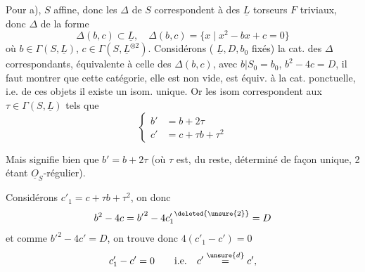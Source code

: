 
Pour a),  $S$ affine, donc les  $\Delta$  de $S$ correspondent à des $\underline L$ torseurs $F$ triviaux, donc $\Delta$  de la forme
\[\Delta(b,c)\subset\underline L,\quad\Delta(b,c)=\{x\mid x^2-bx+c=0\}\]
où $b\in\Gamma(S,\underline L)$, $c\in\Gamma(S,\underline L^{\otimes2})$. Considérons ( $\underline L,D,b_0$ fixés) la cat. des $\Delta$ correspondants,  équivalente à celle des $\Delta(b,c)$, avec $b|S_0=b_0$, $b^2-4c=D$, il faut montrer que cette catégorie,   elle est non vide, est équiv. à la cat. ponctuelle, i.e.   de ces objets il existe un isom. unique. Or les  isom  correspondent aux $\tau\in\Gamma(S,\underline L)$ tels que
\[\left\{\begin{aligned} b'&=b+2\tau\\ c'&=c+\tau b+\tau^2\end{aligned}\right.\]

Mais   signifie bien que $b'=b+2\tau$ (où $\tau$ est, du reste, déterminé de façon unique, 2 étant $\underline O_S$-régulier).  

Considérons $c'_1=c+\tau b+\tau^{2}$, on  donc
\[b^2-4c={b'}^2-4{c'_1}^{\deleted{\unsure{2}}}=D\]
et comme $b'^{2}-4c'=D$, on trouve donc $4(c'_1-c')=0$
\[c'_1-c'=0\qquad\text{i.e.}\quad c'\overset{\unsure{d}}=c',\]
